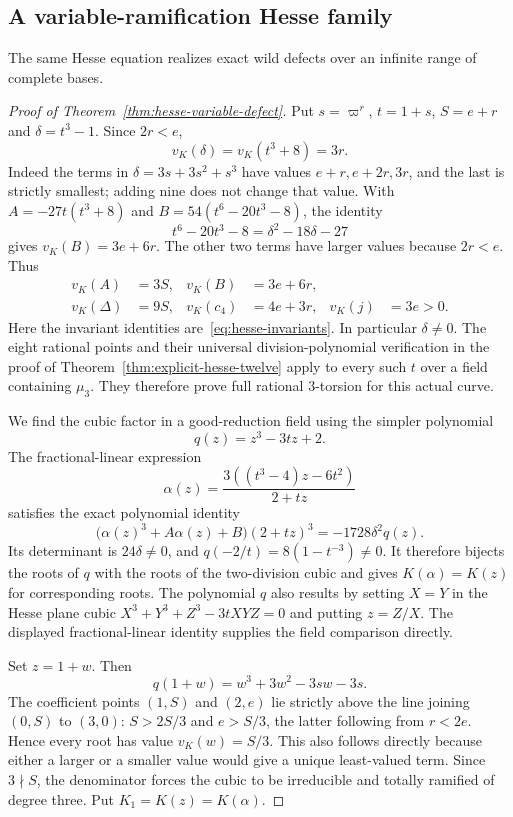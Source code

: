 \subsection{A variable-ramification Hesse family}
The same Hesse equation realizes exact wild defects over an infinite range of complete bases.

\begin{proof}[Proof of Theorem~\ref{thm:hesse-variable-defect}]
Put $s=\varpi^r$, $t=1+s$, $S=e+r$ and $\delta=t^3-1$. Since $2r<e$,
\[
 v_K(\delta)=v_K(t^3+8)=3r.
\]
Indeed the terms in $\delta=3s+3s^2+s^3$ have values $e+r,e+2r,3r$, and the last is strictly smallest; adding nine does not change that value. With $A=-27t(t^3+8)$ and $B=54(t^6-20t^3-8)$, the identity
\[
 t^6-20t^3-8=\delta^2-18\delta-27
\]
gives $v_K(B)=3e+6r$. The other two terms have larger values because $2r<e$. Thus
\begin{equation}\label{eq:variable-hesse-values}
 \begin{aligned}
 v_K(A)&=3S,&v_K(B)&=3e+6r,\\
 v_K(\Delta)&=9S,&v_K(c_4)&=4e+3r,&v_K(j)&=3e>0.
 \end{aligned}
\end{equation}
Here the invariant identities are~\eqref{eq:hesse-invariants}. In particular $\delta\ne0$. The eight rational points and their universal division-polynomial verification in the proof of Theorem~\ref{thm:explicit-hesse-twelve} apply to every such $t$ over a field containing $\mu_3$. They therefore prove full rational $3$-torsion for this actual curve.

We find the cubic factor in a good-reduction field using the simpler polynomial
\[
                         q(z)=z^3-3tz+2.
\]
The fractional-linear expression
\begin{equation}\label{eq:hesse-two-torsion-map}
              \alpha(z)=\frac{3((t^3-4)z-6t^2)}{2+tz}
\end{equation}
satisfies the exact polynomial identity
\[
 \bigl(\alpha(z)^3+A\alpha(z)+B\bigr)(2+tz)^3
                       =-1728\delta^2q(z).
\]
Its determinant is $24\delta\ne0$, and $q(-2/t)=8(1-t^{-3})\ne0$. It therefore bijects the roots of $q$ with the roots of the two-division cubic and gives $K(\alpha)=K(z)$ for corresponding roots. The polynomial $q$ also results by setting $X=Y$ in the Hesse plane cubic $X^3+Y^3+Z^3-3tXYZ=0$ and putting $z=Z/X$. The displayed fractional-linear identity supplies the field comparison directly.

Set $z=1+w$. Then
\[
                     q(1+w)=w^3+3w^2-3sw-3s.
\]
The coefficient points $(1,S)$ and $(2,e)$ lie strictly above the line joining $(0,S)$ to $(3,0)$: $S>2S/3$ and $e>S/3$, the latter following from $r<2e$. Hence every root has value $v_K(w)=S/3$. This also follows directly because either a larger or a smaller value would give a unique least-valued term. Since $3\nmid S$, the denominator forces the cubic to be irreducible and totally ramified of degree three. Put $K_1=K(z)=K(\alpha)$.


\end{proof}
